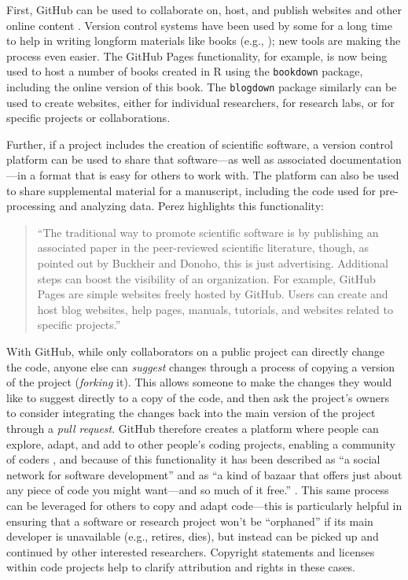 \documentclass[]{tufte-book}
\begin{document}
First, GitHub can be used to collaborate on, host, and publish websites and
other online content \citep{perez2016ten}. Version control systems have been used by
some for a long time to help in writing longform materials like books (e.g.,
\citep{raymond2003art}); new tools are making the process even easier. The GitHub
Pages functionality, for example, is now being used to host a number of books
created in R using the \texttt{bookdown} package, including the online version of this
book. The \texttt{blogdown} package similarly can be used to create websites, either
for individual researchers, for research labs, or for specific projects or
collaborations.

Further, if a project includes the creation of scientific software, a version
control platform can be used to share that software---as well as associated
documentation---in a format that is easy for others to work with. The platform
can also be used to share supplemental material for a manuscript, including the
code used for pre-processing and analyzing data. Perez highlights this
functionality:

\begin{quote}
``The traditional way to promote scientific software is by publishing an
associated paper in the peer-reviewed scientific literature, though, as pointed
out by Buckheir and Donoho, this is just advertising. Additional steps can boost
the visibility of an organization. For example, GitHub Pages are simple websites
freely hosted by GitHub. Users can create and host blog websites, help pages,
manuals, tutorials, and websites related to specific projects.'' \citep{perez2016ten}
\end{quote}

With GitHub, while only collaborators on a public project can directly change
the code, anyone else can \emph{suggest} changes through a process of copying a
version of the project (\emph{forking} it). This allows someone to make the changes
they would like to suggest directly to a copy of the code, and then ask the
project's owners to consider integrating the changes back into the main version
of the project through a \emph{pull request}. GitHub therefore creates a platform
where people can explore, adapt, and add to other people's coding projects,
enabling a community of coders \citep{perez2016ten}, and because of this
functionality it has been described as ``a social network for software
development'' \citep{perkel2018git} and as ``a kind of bazaar that offers just about
any piece of code you might want---and so much of it free.'' \citep{metz2015github}.
This same process can be leveraged for others to copy and adapt code---this is
particularly helpful in ensuring that a software or research project won't be
``orphaned'' if its main developer is unavailable (e.g., retires, dies), but
instead can be picked up and continued by other interested researchers.
Copyright statements and licenses within code projects help to clarify
attribution and rights in these cases.
\end{document}
